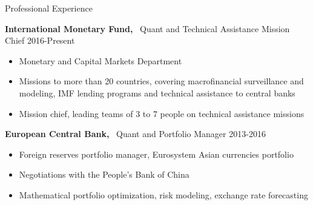 \documentclass[usegeometry, 10pt, a4paper]{cv} %
\newcommand{\activite}[1]{\textbf{#1}\ }
\begin{document}
\vspace{0.25cm}


\begin{rubriquetableau}[0.95\textwidth]{Professional Experience}\\
\vspace{-0.5cm}

\activite{International Monetary Fund,} Quant and Technical Assistance Mission Chief \hfill 2016-Present \\
\vspace{-0.2cm}

\begin{itemize}[label={},
  rightmargin=\dimexpr\linewidth-13cm-\leftmargin\relax]
\item Monetary and Capital Markets Department
\item Missions to more than 20 countries, covering macrofinancial surveillance
  and modeling, IMF lending programs and technical assistance to central banks  
\item Mission chief, leading teams of 3 to 7 people on technical assistance
  missions
 \end{itemize}
 
\vspace{0.5cm}

\activite{European Central Bank,} Quant and Portfolio Manager \hfill 2013-2016 \\
\vspace{-0.2cm}

\begin{itemize}[label={}, rightmargin=\dimexpr\linewidth-13cm-\leftmargin\relax]
\item Foreign reserves portfolio manager, Eurosystem Asian currencies portfolio
\item Negotiations with the People's Bank of China
\item Mathematical portfolio optimization, risk modeling, exchange rate
  forecasting
\end{itemize}
\end{rubriquetableau}

\end{document}
